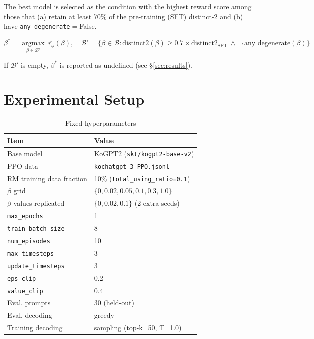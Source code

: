 \documentclass[conference]{IEEEtran}
\begin{document}
The best model is selected as the condition with the highest reward
score among those that (a) retain at least 70\% of the pre-training
(SFT) distinct-2 and (b) have \texttt{any\_degenerate}$=$False.

\begin{equation}
\beta^{*} = \operatorname*{argmax}_{\beta \in \mathcal{B}'} \
\overline{r_\phi}(\beta), \quad
\mathcal{B}' = \{\beta \in \mathcal{B} : \text{distinct2}(\beta) \geq
0.7 \times \text{distinct2}_{\text{SFT}} \ \land \ \lnot\,\text{any\_degenerate}(\beta)\}
\label{eq:selection}
\end{equation}

If $\mathcal{B}'$ is empty, $\beta^{*}$ is reported as undefined
(see \S\ref{sec:results}).

\section{Experimental Setup}

\begin{table}[h]
\centering
\caption{Fixed hyperparameters}
\label{tab:setup}
\begin{tabular}{@{}ll@{}}
\toprule
Item & Value \\
\midrule
Base model & KoGPT2 (\texttt{skt/kogpt2-base-v2}) \\
PPO data & \texttt{kochatgpt\_3\_PPO.jsonl} \\
RM training data fraction & 10\% (\texttt{total\_using\_ratio=0.1}) \\
$\beta$ grid & $\{0, 0.02, 0.05, 0.1, 0.3, 1.0\}$ \\
$\beta$ values replicated & $\{0, 0.02, 0.1\}$ (2 extra seeds) \\
\texttt{max\_epochs} & 1 \\
\texttt{train\_batch\_size} & 8 \\
\texttt{num\_episodes} & 10 \\
\texttt{max\_timesteps} & 3 \\
\texttt{update\_timesteps} & 3 \\
\texttt{eps\_clip} & 0.2 \\
\texttt{value\_clip} & 0.4 \\
Eval. prompts & 30 (held-out) \\
Eval. decoding & greedy \\
Training decoding & sampling (top-k=50, T=1.0) \\
\bottomrule
\end{tabular}
\end{table}
\end{document}
